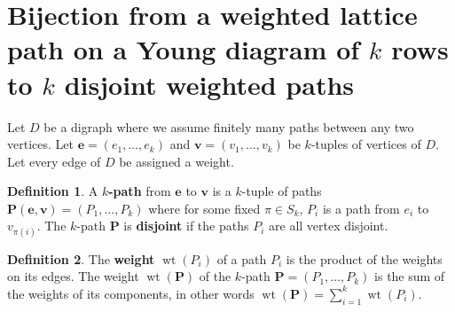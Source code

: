 \documentclass[11pt]{article}
\numberwithin{equation}{section}
\theoremstyle{plain}
\theoremstyle{definition}
\newtheorem{defn}{Definition}[section]
\theoremstyle{remark}
\DeclareMathOperator{\wt}{wt}
\begin{document}



\section{Bijection from a weighted lattice path on a Young diagram of $k$ rows to $k$ disjoint weighted paths}

Let $D$ be a digraph where we assume finitely many paths between any two vertices. Let $\textbf{e}=(e_1,\ldots,e_k)$ and $\textbf{v}=(v_1,\ldots,v_k)$ be $k$-tuples of vertices of $D$. Let every edge of $D$ be assigned a weight.

\begin{defn} A \textbf{$k$-path} from $\textbf{e}$ to $\textbf{v}$ is a $k$-tuple of paths $\textbf{P}(\textbf{e},\textbf{v})=(P_1,\ldots,P_k)$ where for some fixed $\pi \in S_k$, $P_i$ is a path from $e_i$ to $v_{\pi(i)}$. The $k$-path $\textbf{P}$ is \textbf{disjoint} if the paths $P_i$ are all vertex disjoint. 
\end{defn}

\begin{defn}
The \textbf{weight} $\wt(P_i)$ of a path $P_i$ is the product of the weights on its edges. The weight $\wt(\textbf{P})$ of the $k$-path $\textbf{P}=(P_1,\ldots,P_k)$ is the sum of the weights of its components, in other words $\wt(\textbf{P}) = \sum_{i=1}^k \wt(P_i)$.
\end{defn}
\end{document}
